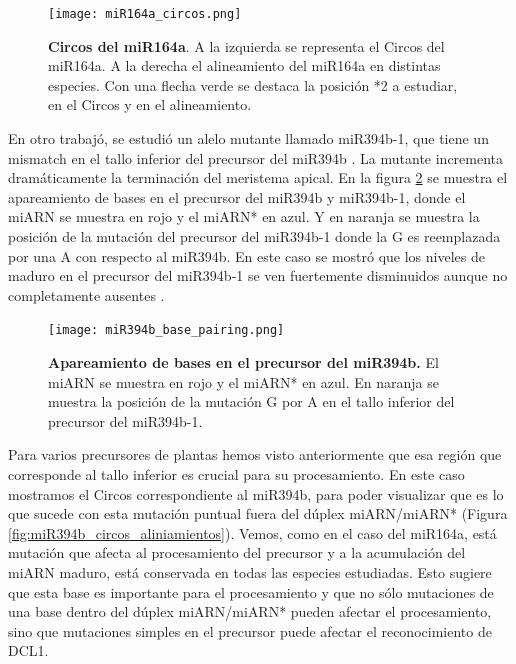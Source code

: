     \begin{figure}[htbp!] 
        \centering    
        \texttt{[image: miR164a\_circos.png]}
        \caption[Circos del miR164a]{
			\textbf{Circos del miR164a}.
			A la izquierda se representa el Circos del miR164a.
			A la derecha el alineamiento del miR164a en distintas especies. 
			Con una flecha verde se destaca la posición *2 a estudiar, en el Circos y en el alineamiento.
        }
        \label{fig:miR164a_circos}
    \end{figure}

En otro trabajó, se estudió un alelo mutante llamado miR394b-1, que tiene un mismatch en el tallo inferior del precursor del miR394b \citep{pmid23333352}.
La mutante incrementa dramáticamente la terminación del meristema apical.   
En la figura \ref{fig:miR164_base_pairing} se muestra el apareamiento de bases en el precursor del miR394b y miR394b-1, donde el miARN se muestra en rojo y el miARN* en azul.
Y en naranja se muestra la posición de la mutación del precursor del miR394b-1 donde la G es reemplazada por una A con respecto al miR394b.
En este caso se mostró que los niveles de maduro en el precursor del miR394b-1 se ven fuertemente disminuidos aunque no completamente ausentes \citep{pmid23333352}. 

\begin{figure}[htbp!] 
	\centering    
	\texttt{[image: miR394b\_base\_pairing.png]}
	\caption[Apareamiento de bases en el precursor del miR394b]{
		\textbf{Apareamiento de bases en el precursor del miR394b.}
		El miARN se muestra en rojo y el miARN* en azul.
		En naranja se muestra la posición de la mutación G por A en el tallo inferior del precursor del miR394b-1.
	}
	\label{fig:miR164_base_pairing}
\end{figure}

Para varios precursores de plantas hemos visto anteriormente que esa región que corresponde al tallo inferior es crucial para su procesamiento.
En este caso mostramos el Circos correspondiente al miR394b, para poder visualizar que es lo que sucede con esta mutación puntual fuera del dúplex miARN/miARN* (Figura \ref{fig:miR394b_circos_aliniamientos}).
Vemos, como en el caso del miR164a, está mutación que afecta al procesamiento del precursor y a la acumulación del miARN maduro, está conservada en todas las especies estudiadas.
Esto sugiere que esta base es importante para el procesamiento y que no sólo mutaciones de una base dentro del dúplex miARN/miARN* pueden afectar el procesamiento, sino que mutaciones simples en el precursor puede afectar el reconocimiento de DCL1. 

